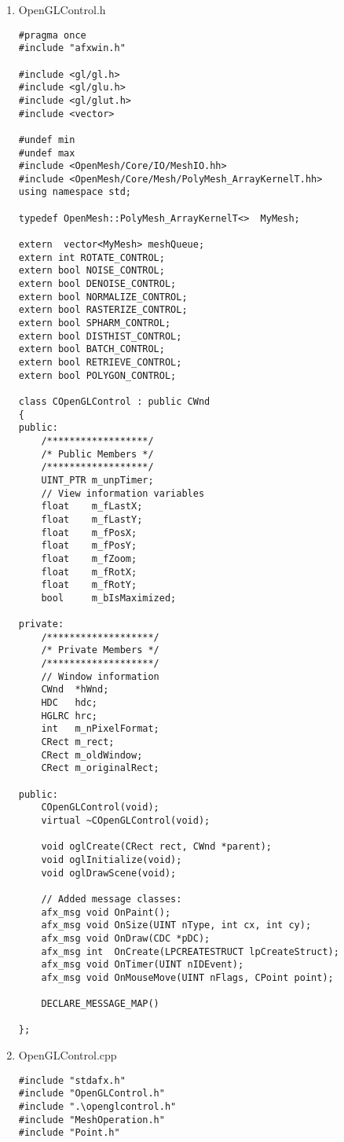 \begin{enumerate}[1.]
\item OpenGLControl.h

\begin{lstlisting}[xleftmargin=0em]
#pragma once
#include "afxwin.h"

#include <gl/gl.h>
#include <gl/glu.h>
#include <gl/glut.h>
#include <vector>

#undef min
#undef max
#include <OpenMesh/Core/IO/MeshIO.hh>
#include <OpenMesh/Core/Mesh/PolyMesh_ArrayKernelT.hh>
using namespace std;

typedef OpenMesh::PolyMesh_ArrayKernelT<>  MyMesh;

extern  vector<MyMesh> meshQueue;
extern int ROTATE_CONTROL;
extern bool NOISE_CONTROL;
extern bool DENOISE_CONTROL;
extern bool NORMALIZE_CONTROL;
extern bool RASTERIZE_CONTROL;
extern bool SPHARM_CONTROL;
extern bool DISTHIST_CONTROL;
extern bool BATCH_CONTROL;
extern bool RETRIEVE_CONTROL;
extern bool POLYGON_CONTROL;

class COpenGLControl : public CWnd
{
public:
	/******************/
	/* Public Members */
	/******************/
	UINT_PTR m_unpTimer;
	// View information variables
	float	 m_fLastX;
	float	 m_fLastY;
	float	 m_fPosX;
	float	 m_fPosY;
	float	 m_fZoom;
	float	 m_fRotX;
	float	 m_fRotY;
	bool	 m_bIsMaximized;

private:
	/*******************/
	/* Private Members */
	/*******************/
	// Window information
	CWnd  *hWnd;
	HDC   hdc;			
	HGLRC hrc;			
	int   m_nPixelFormat;
	CRect m_rect;
	CRect m_oldWindow;
	CRect m_originalRect;

public:
	COpenGLControl(void);
	virtual ~COpenGLControl(void);

	void oglCreate(CRect rect, CWnd *parent);
	void oglInitialize(void);
	void oglDrawScene(void);

	// Added message classes:
	afx_msg void OnPaint();
	afx_msg void OnSize(UINT nType, int cx, int cy);
	afx_msg	void OnDraw(CDC *pDC);
	afx_msg int  OnCreate(LPCREATESTRUCT lpCreateStruct);
	afx_msg void OnTimer(UINT nIDEvent);
	afx_msg void OnMouseMove(UINT nFlags, CPoint point);

	DECLARE_MESSAGE_MAP()

};
\end{lstlisting}

\item OpenGLControl.cpp

\begin{lstlisting}[xleftmargin=0em]
#include "stdafx.h"
#include "OpenGLControl.h"
#include ".\openglcontrol.h"
#include "MeshOperation.h"
#include "Point.h"


\end{lstlisting}
\end{enumerate}
